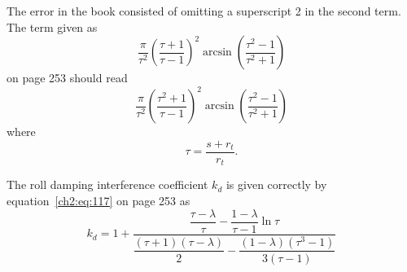 The error in the book consisted of omitting a superscript 2 in the second term.
The term given as
\begin{equation*}
\frac{\pi}{\tau^{2}}\left(\frac{\tau + 1}{\tau - 1}\right)^{2}\arcsin\left(\frac{\tau^{2} - 1}{\tau^{2} + 1}\right)
\end{equation*}
on page 253 should read
\begin{equation*}
\frac{\pi}{\tau^{2}}\left(\frac{\tau^{2} + 1}{\tau - 1}\right)^{2}\arcsin\left(\frac{\tau^{2} - 1}{\tau^{2} + 1}\right)
\end{equation*}
where
\begin{equation*}
\tau = \frac{s + r_t}{r_t}.
\end{equation*}

The roll damping interference coefficient $k_d$ is given correctly by
equation~\eqref{ch2:eq:117} on page 253 as
\begin{equation*}
k_d = 1 + \frac{\dfrac{\tau - \lambda}{\tau} - \dfrac{1 - \lambda}{\tau - 1}\ln\tau}{\dfrac{(\tau + 1)(\tau - \lambda)}{2} - \dfrac{(1 - \lambda)(\tau^{3} - 1)}{3(\tau - 1)}}
\end{equation*}
